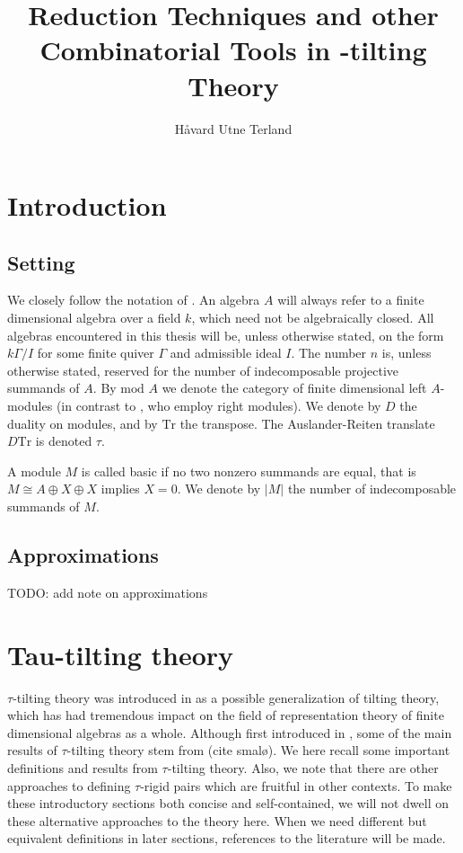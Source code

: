 \documentclass[]{article}
\title{Reduction Techniques and other Combinatorial Tools in \tu-tilting Theory}
\author{Håvard Utne Terland}
\theoremstyle{definition}
\newcommand{\mo}{\ensuremath{\text{mod }}}
\newcommand{\tu}{\ensuremath{\tau}}
\begin{document}
\maketitle

\begin{abstract}

\end{abstract}

\section{Introduction}


\subsection{Setting}
We closely follow the notation of \cite{assem_skowronski_simson_2006}. An algebra $A$ will always refer to a finite dimensional algebra over a field $k$, which need not be algebraically closed. All algebras encountered in this thesis will be, unless otherwise stated, on the form $k\Gamma/I$ for some finite quiver $\Gamma$ and admissible ideal $I$. The number $n$ is, unless otherwise stated, reserved for the number of indecomposable projective summands of $A$. By $\mo A$ we denote the category of finite dimensional left $A$-modules (in contrast to \cite{assem_skowronski_simson_2006}, who employ right modules). We denote by $D$ the duality on modules, and by $\text{Tr}$ the transpose. The Auslander-Reiten translate $D\text{Tr}$ is denoted $\tau$.

A module $M$ is called basic if no two nonzero summands are equal, that is $M \cong A \oplus X \oplus X$ implies $X = 0$. We denote by $|M|$ the number of indecomposable summands of $M$. 

\subsection{Approximations}
TODO: add note on approximations


\section{Tau-tilting theory}
$\tau$-tilting theory was introduced in \cite{tau} as a possible generalization of tilting theory, which has had tremendous impact on the field of representation theory of finite dimensional algebras as a whole. Although first introduced in \cite{tau}, some of the main results of $\tau$-tilting theory stem from (cite smalø). We here recall some important definitions and results from $\tau$-tilting theory. Also, we note that there are other approaches to defining \tu-rigid pairs which are fruitful in other contexts. To make these introductory sections both concise and self-contained, we will not dwell on these alternative approaches to the theory here.  When we need different but equivalent definitions in later sections, references to the literature will be made.
\end{document}
